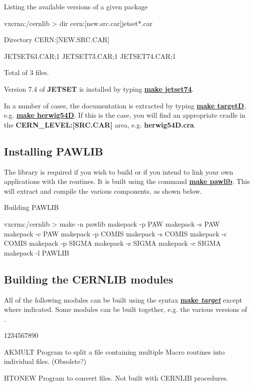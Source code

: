 \begin{XMPt}{Listing the available versions of a given package}

vxcrna:/cernlib > dir cern:[new.src.car]jetset*.car

Directory CERN:[NEW.SRC.CAR]

JETSET63.CAR;1      JETSET73.CAR;1      JETSET74.CAR;1     

Total of 3 files.

\end{XMPt}

Version 7.4 of {\bf JETSET} is installed by typing {\underline {\bf make jetset74}}.

In a number of cases, the documentation is extracted by typing
{\underline {\bf make targetD}}, e.g. {\underline {\bf make herwig54D}}. If this is the case,
you will find an appropriate cradle in the {\bf CERN\_LEVEL:[SRC.CAR]}
area, e.g. {\bf herwig54D.cra}.

\subsection{Installing PAWLIB}

The \PAW{} library \PAWLIB{} is required if you wish to build 
\PAW{} or if you intend
to link your own applications with the \PAW{} routines. It is built
using the command {\underline {\bf make pawlib}}. This will extract and compile
the various components, as shown below.

\begin{XMPt}{Building PAWLIB}

vxcrna:/cernlib > make -n pawlib
        makepack -p PAW     
        makepack -s PAW     
        makepack -c PAW     
        makepack -p COMIS   
        makepack -s COMIS   
        makepack -c COMIS   
        makepack -p SIGMA    
        makepack -s SIGMA    
        makepack -c SIGMA    
        makepack -l PAWLIB 

\end{XMPt}

\subsection{Building the CERNLIB modules}

All of the following modules can be built using the syntax
{\underline {\bf make {\it target}}} except where indicated. Some
modules can be built together, e.g. the various versions of \PAW{}.

\begin{DLtt}{1234567890}
\item[AKMULT]Program to split a file containing multiple Macro routines
into individual files. (Obsolete?)
\item[HTONEW]Program to convert \HBOOK{} files. Not built with CERNLIB procedures.
\end{DLtt}

